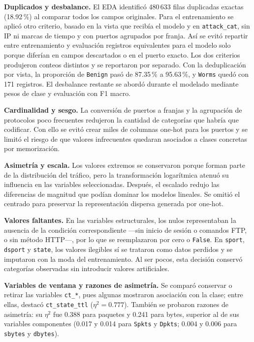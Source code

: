 \documentclass[conference]{IEEEtran}
\begin{document}
\textbf{Duplicados y desbalance.} El EDA identificó 480\,633 filas duplicadas exactas (18.92\,\%) al comparar todos los campos originales. Para el entrenamiento se aplicó otro criterio, basado en la vista que recibía el modelo y en \texttt{attack\_cat}, sin IP ni marcas de tiempo y con puertos agrupados por franja. Así se evitó repartir entre entrenamiento y evaluación registros equivalentes para el modelo solo porque diferían en campos descartados o en el puerto exacto. Los dos criterios produjeron conteos distintos y se reportaron por separado. Con la deduplicación por vista, la proporción de \texttt{Benign} pasó de 87.35\,\% a 95.63\,\%, y \texttt{Worms} quedó con 171 registros. El desbalance restante se abordó durante el modelado mediante pesos de clase y evaluación con F1 macro.

\textbf{Cardinalidad y sesgo.} La conversión de puertos a franjas y la agrupación de protocolos poco frecuentes redujeron la cantidad de categorías que habría que codificar. Con ello se evitó crear miles de columnas one-hot para los puertos y se limitó el riesgo de que valores infrecuentes quedaran asociados a clases concretas por memorización.

\textbf{Asimetría y escala.} Los valores extremos se conservaron porque forman parte de la distribución del tráfico, pero la transformación logarítmica atenuó su influencia en las variables seleccionadas. Después, el escalado redujo las diferencias de magnitud que podían dominar los modelos lineales. Se omitió el centrado para preservar la representación dispersa generada por one-hot.

\textbf{Valores faltantes.} En las variables estructurales, los nulos representaban la ausencia de la condición correspondiente —sin inicio de sesión o comandos FTP, o sin método HTTP—, por lo que se reemplazaron por cero o \texttt{False}. En \texttt{sport}, \texttt{dsport} y \texttt{state}, los valores ilegibles sí se trataron como datos perdidos y se imputaron con la moda del entrenamiento. Al ser pocos, esta decisión conservó categorías observadas sin introducir valores artificiales.

\textbf{Variables de ventana y razones de asimetría.} Se comparó conservar o retirar las variables \texttt{ct\_*}, pues algunas mostraron asociación con la clase; entre ellas, destacó \texttt{ct\_state\_ttl} ($\eta^2=0.777$). También se probaron razones de asimetría: su $\eta^2$ fue 0.388 para paquetes y 0.241 para bytes, superior al de sus variables componentes (0.017 y 0.014 para \texttt{Spkts} y \texttt{Dpkts}; 0.004 y 0.006 para \texttt{sbytes} y \texttt{dbytes}).
\end{document}
